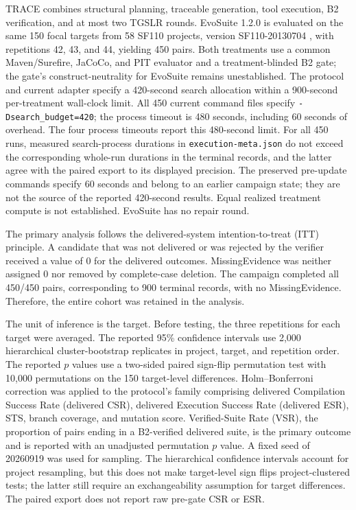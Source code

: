 \documentclass[pdflatex,sn-basic,Numbered,iicol]{sn-jnl}
\begin{document}
TRACE combines structural planning, traceable generation, tool execution, B2 verification, and at most two TGSLR rounds. EvoSuite 1.2.0 \cite{bib1} is evaluated on the same 150 focal targets from 58 SF110 projects, version SF110-20130704 \cite{bib37}, with repetitions 42, 43, and 44, yielding 450 pairs. Both treatments use a common Maven/Surefire, JaCoCo, and PIT evaluator and a treatment-blinded B2 gate; the gate's construct-neutrality for EvoSuite remains unestablished. The protocol and current adapter specify a 420-second search allocation within a 900-second per-treatment wall-clock limit. All 450 current command files specify \nolinkurl{-Dsearch_budget=420}; the process timeout is 480 seconds, including 60 seconds of overhead. The four process timeouts report this 480-second limit. For all 450 runs, measured search-process durations in \texttt{execution-meta.json} do not exceed the corresponding whole-run durations in the terminal records, and the latter agree with the paired export to its displayed precision. The preserved pre-update commands specify 60 seconds and belong to an earlier campaign state; they are not the source of the reported 420-second results. Equal realized treatment compute is not established. EvoSuite has no repair round.

The primary analysis follows the delivered-system intention-to-treat (ITT) principle. A candidate that was not delivered or was rejected by the verifier received a value of 0 for the delivered outcomes. MissingEvidence was neither assigned 0 nor removed by complete-case deletion. The campaign completed all 450/450 pairs, corresponding to 900 terminal records, with no MissingEvidence. Therefore, the entire cohort was retained in the analysis.

The unit of inference is the target. Before testing, the three repetitions for each target were averaged. The reported 95\% confidence intervals use 2,000 hierarchical cluster-bootstrap replicates in project, target, and repetition order. The reported $p$ values use a two-sided paired sign-flip permutation test with 10,000 permutations on the 150 target-level differences. Holm--Bonferroni correction was applied to the protocol's family comprising delivered Compilation Success Rate (delivered CSR), delivered Execution Success Rate (delivered ESR), STS, branch coverage, and mutation score. Verified-Suite Rate (VSR), the proportion of pairs ending in a B2-verified delivered suite, is the primary outcome and is reported with an unadjusted permutation $p$ value. A fixed seed of 20260919 was used for sampling. The hierarchical confidence intervals account for project resampling, but this does not make target-level sign flips project-clustered tests; the latter still require an exchangeability assumption for target differences. The paired export does not report raw pre-gate CSR or ESR.
\end{document}
